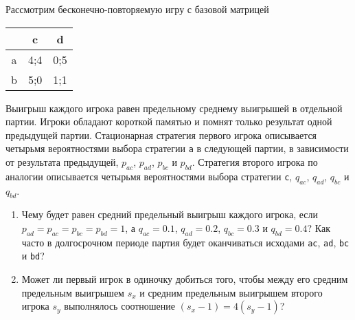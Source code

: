 \documentclass{article}
\begin{document}
Рассмотрим бесконечно-повторяемую игру с базовой матрицей

\begin{tabular}{c|cc} 
 & c & d \\ 
\hline
a & 4;4 & 0;5 \\ 
b & 5;0 & 1;1 \\ 
\end{tabular} 

Выигрыш каждого игрока равен предельному среднему выигрышей в отдельной партии. Игроки обладают короткой памятью и помнят только результат одной предыдущей партии. Стационарная стратегия первого игрока описывается четырьмя вероятностями выбора стратегии \verb|a| в следующей партии, в зависимости от результата предыдущей, $p_{ac}$, $p_{ad}$, $p_{bc}$ и $p_{bd}$. Стратегия второго игрока по аналогии описывается четырьмя вероятностями выбора стратегии \verb|c|, $q_{ac}$, $q_{ad}$, $q_{bc}$ и $q_{bd}$. 

\begin{enumerate}
\item Чему будет равен средний предельный выигрыш каждого игрока, если $p_{ad}=p_{ac}=p_{bc}=p_{bd}=1$, а $q_{ac}=0.1$, $q_{ad}=0.2$, $q_{bc}=0.3$ и $q_{bd}=0.4$? Как часто в долгосрочном периоде партия будет оканчиваться исходами \verb|ac|, \verb|ad|, \verb|bc| и \verb|bd|?
\item Может ли первый игрок в одиночку добиться того, чтобы между его средним предельным выигрышем $s_x$ и средним предельным выигрышем второго игрока $s_y$ выполнялось соотношение $(s_x-1)=4(s_y-1)$?

\end{enumerate}
\end{document}

